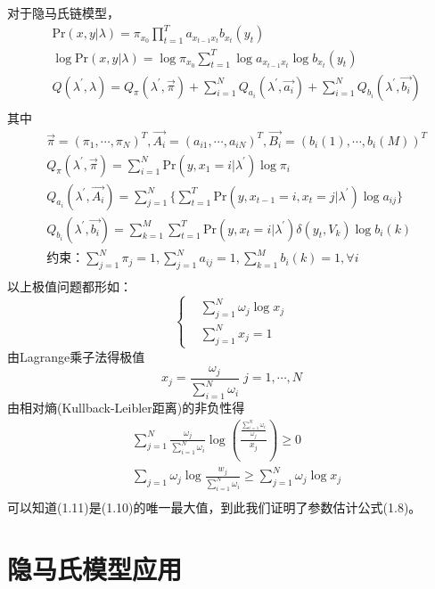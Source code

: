 对于隐马氏链模型，
$$
\begin{aligned}
& \mbox{Pr}(x,y | \lambda)=\pi_{x_{0}} \prod\limits_{t=1}^{T} a_{x_{t-1} x_{t}} b_{x_{t}}(y_{t})\\
& \log \mbox{Pr}(x,y | \lambda)=\log \pi_{x_{0}} \sum\limits_{t=1}^{T} \log a_{x_{t-1} x_{t}} \log b_{x_{t}}(y_{t})\\
& Q(\lambda^{\prime},\lambda)=Q_{\pi}(\lambda^{\prime},
\vec{\pi})+\sum\limits_{i=1}^{N}
Q_{a_{i}}(\lambda^{\prime},\vec{a_{i}}) +\sum\limits_{i=1}^{N}
Q_{b_{i}}(\lambda^{\prime},\vec{b_{i}})\\
\end{aligned}
$$
其中
$$
\begin{aligned}
  &\vec{\pi}=(\pi_{1},\cdots,\pi_{N})^{T}, \vec{A_{i}}= (a_{i1},\cdots,a_{iN})^{T},\vec{B_{i}}= (b_{i}(1),\cdots,b_{i}(M))^{T}\\
  &Q_{\pi}(\lambda^{\prime},\vec{\pi})
   =\sum\limits_{i=1}^{N} \mbox{Pr}(y,x_{1}=i | \lambda^{\prime}) \log\pi_{i}\\
  &Q_{a_{i}}(\lambda^{\prime},\vec{A_{i}})
   =\sum\limits_{j=1}^{N}\{ \sum\limits_{t=1}^{T}
    \mbox{Pr}(y,x_{t-1}=i,x_{t}=j | \lambda^{\prime}) \log a_{ij} \}\\
  &Q_{b_{i}}(\lambda^{\prime},\vec{b_{i}})
   =\sum\limits_{k=1}^{M}\sum\limits_{t=1}^{T} \mbox{Pr}(y,x_{t}=i | \lambda^{\prime}) \delta(y_{t},V_{k}) \log b_{i}(k)\\
  & \mbox{约束：} \sum\limits_{j=1}^{N} \pi_{j}=1, \sum\limits_{j=1}^{N} a_{ij}=1, \sum\limits_{k=1}^{M} b_{i}(k)=1, \forall i\\
\end{aligned}
$$
以上极值问题都形如：
$$
\left\{
\begin{array}{ll}
  &\sum\limits_{j=1}^{N} \omega_{j} \log x_{j}\\
  &\sum\limits_{j=1}^{N} x_{j}=1
\end{array}
\right.
$$
由Lagrange乘子法得极值
$$
  x_{j}=\frac{\omega_{j}}{\sum\limits_{i=1}^{N}\omega_{i}} \; j=1,\cdots,N
$$
由相对熵(Kullback-Leibler距离)的非负性得
$$
\begin{aligned}
 &\sum\limits_{j=1}^{N} \frac{\omega_{j}}{\sum\limits_{i=1}^{N}\omega_{i}}
   \log (\frac{\frac{\sum\limits_{i=1}^{N}\omega_{i}}{\omega_{j}}}{x_{j}} ) \geq 0 \\
 &\sum\limits_{j=1} \omega_{j} \log \frac{w_{j}}{\sum\limits_{i=1}^{N} \omega_{i}}
   \geq \sum\limits_{j=1}^{N} \omega_{j} \log x_{j}\\
\end{aligned}
$$
可以知道(1.11)是(1.10)的唯一最大值，到此我们证明了参数估计公式(1.8)。

\section{隐马氏模型应用}

